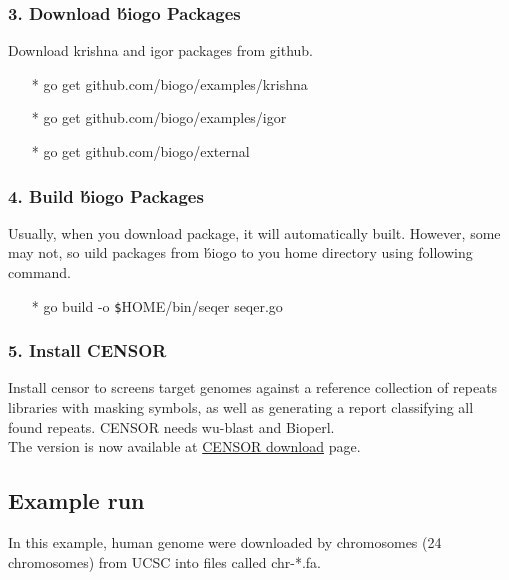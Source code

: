 \documentclass[12pt]{report}
\begin{document}
\subsubsection{3. Download \'biogo Packages}
Download krishna and igor packages from github.

\begin{enumerate}
\item[*] go get github.com/biogo/examples/krishna
\item[*] go get github.com/biogo/examples/igor
\item[*] go get github.com/biogo/external
\end{enumerate}

\subsubsection{4. Build \'biogo Packages}
Usually, when you download package, it will automatically built. However, some may not, so uild packages from \'biogo to you home directory using following command.

\begin{enumerate}
	\item[*] go build -o \texttt{\$}HOME/bin/seqer seqer.go
\end{enumerate}

\subsubsection{5. Install CENSOR}
Install censor to screens target genomes against a reference collection of repeats libraries with masking symbols, as well as generating a report classifying all found repeats. CENSOR needs wu-blast and Bioperl.\\

The version is now available at \href{http://www.girinst.org/downloads/software/censor/} {\color{blue}CENSOR download} page.



\subsection*{Example run}
In this example, human genome were downloaded by chromosomes (24 chromosomes) from UCSC into files called chr-*.fa.\\
\end{document}
